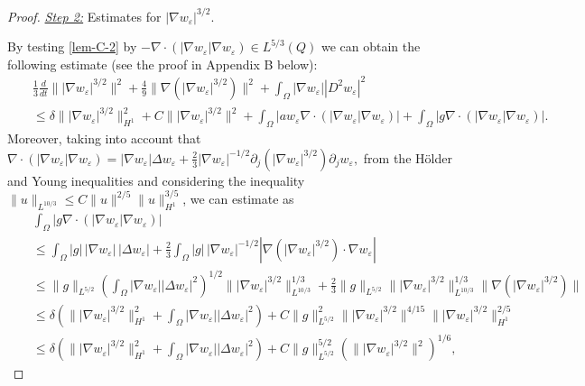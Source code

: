\documentclass[11pt,reqno]{amsart}%
\numberwithin{equation}{section}
\begin{document}
{\begin{proof}
 \noindent\underline{\it Step 2:} Estimates for $|\nabla w_\varepsilon|^{3/2}$. 

 
 By testing \eqref{lem-C-2} by $-\nabla\cdot(|\nabla w_\varepsilon|\nabla w_\varepsilon)\in L^{5/3 }(Q)$ we can obtain the following estimate (see the proof in Appendix B below):
 \begin{eqnarray}
&&\!\frac13 \frac{d}{dt} \||\nabla w_\varepsilon|^{3/2}\|^2+\frac49\|\nabla(|\nabla w_\varepsilon|^{3/2})\|^2
 \!+\int_\Omega|\nabla w_\varepsilon||D^2w_\varepsilon|^2\nonumber\\
 && \le \!\delta\||\nabla w_\varepsilon|^{3/2}\|^2_{H^1}\!+\!C\||\nabla w_\varepsilon|^{3/2}\|^2\!+\!\!\int_\Omega|a w_\varepsilon\nabla\!\cdot\!(|\nabla w_\varepsilon|\nabla w_\varepsilon)|\!+\!\!\int_\Omega|g\nabla\!\cdot\!(|\nabla w_\varepsilon|\nabla w_\varepsilon)|.
\label{lem-C-4}
 \end{eqnarray}
 Moreover, taking into account that
 $\nabla\cdot(|\nabla w_\varepsilon|\nabla w_\varepsilon)=|\nabla w_\varepsilon|\Delta w_\varepsilon+\frac23|\nabla w_\varepsilon|^{-1/2}\partial_j(|\nabla w_\varepsilon|^{3/2})\partial_jw_\varepsilon,$ from the H\"older  and 
 Young inequalities and considering the inequality 
 $\|u\|_{L^{10/3}}\le C\|u\|^{2/5}\|u\|^{3/5}_{H^1}$,  we can estimate as 
  \begin{eqnarray}
 &&\int_\Omega|g\nabla\cdot(|\nabla w_\varepsilon|\nabla w_\varepsilon)|
 \nonumber\\
 &&\le\int_\Omega |g| \, |\nabla w_\varepsilon|\, |\Delta w_\varepsilon|
+\frac23\int_\Omega |g| \, |\nabla w_\varepsilon|^{-1/2} |\nabla(|\nabla w_\varepsilon|^{3/2})\cdot\nabla w_\varepsilon|
\nonumber\\
&& \le \|g\|_{L^{5/2}}\left(\int_\Omega|\nabla w_\varepsilon||\Delta w_\varepsilon|^2\right)^{1/2}
 \||\nabla w_\varepsilon|^{3/2}\|^{1/3}_{L^{10/3}}
 +\frac23 \|g\|_{L^{5/2}} \||\nabla w_\varepsilon|^{3/2}\|^{1/3}_{L^{10/3}}\|\nabla(|\nabla w_\varepsilon|^{3/2})\|\nonumber\\
 &&\le\delta\left(\||\nabla w_\varepsilon|^{3/2}\|^2_{H^1}+\int_\Omega|\nabla w_\varepsilon||\Delta w_\varepsilon|^2\right)
 +C\|g\|_{L^{5/2}}^{2} \||\nabla w_\varepsilon|^{3/2}\|^{4/15} 
 \||\nabla w_\varepsilon|^{3/2}\|_{H^1}^{2/5}
 \nonumber\\
 &&\le\delta\left(\||\nabla w_\varepsilon|^{3/2}\|^2_{H^1}+\int_\Omega|\nabla w_\varepsilon||\Delta w_\varepsilon|^2\right)
 +C\|g\|_{L^{5/2}}^{5/2} (\||\nabla w_\varepsilon|^{3/2}\|^2)^{1/6} ,
  \label{lem-C-5-1}
 \end{eqnarray}

\end{proof}}
\end{document}

